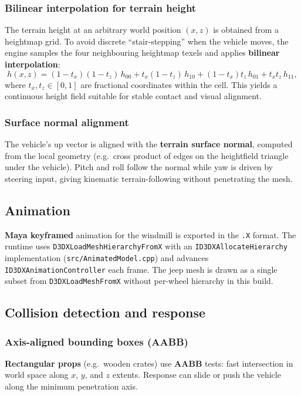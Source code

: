 \documentclass[11pt,a4paper]{article}
\begin{document}
\subsubsection{Bilinear interpolation for terrain height}
The terrain height at an arbitrary world position $(x,z)$ is obtained from a heightmap grid. To avoid discrete ``stair-stepping'' when the vehicle moves, the engine samples the four neighbouring heightmap texels and applies \textbf{bilinear interpolation}:
\[
h(x,z) = (1-t_x)(1-t_z)\,h_{00} + t_x(1-t_z)\,h_{10} + (1-t_x)t_z\,h_{01} + t_x t_z\,h_{11},
\]
where $t_x,t_z \in [0,1]$ are fractional coordinates within the cell. This yields a continuous height field suitable for stable contact and visual alignment.

\subsubsection{Surface normal alignment}
The vehicle's up vector is aligned with the \textbf{terrain surface normal}, computed from the local geometry (e.g.\ cross product of edges on the heightfield triangle under the vehicle). Pitch and roll follow the normal while yaw is driven by steering input, giving kinematic terrain-following without penetrating the mesh.

\subsection{Animation}
\label{sec:techniques-animation}
\textbf{Maya keyframed} animation for the windmill is exported in the \texttt{.X} format. The runtime uses \texttt{D3DXLoadMeshHierarchyFromX} with an \texttt{ID3DXAllocateHierarchy} implementation (\texttt{src/AnimatedModel.cpp}) and advances \texttt{ID3DXAnimationController} each frame. The jeep mesh is drawn as a single subset from \texttt{D3DXLoadMeshFromX} without per-wheel hierarchy in this build.

\subsection{Collision detection and response}
\label{sec:techniques-collision}

\subsubsection{Axis-aligned bounding boxes (AABB)}
\textbf{Rectangular props} (e.g.\ wooden crates) use \textbf{AABB} tests: fast intersection in world space along $x$, $y$, and $z$ extents. Response can slide or push the vehicle along the minimum penetration axis.
\end{document}
